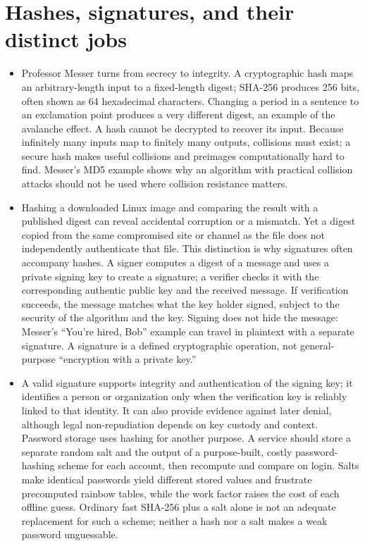 \documentclass[10pt]{article}
\begin{document}
\section*{Hashes, signatures, and their distinct jobs}

\begin{itemize}[leftmargin=1.25em, itemsep=0.3em, parsep=0pt, topsep=0pt]
    \item Professor Messer turns from secrecy to integrity. A cryptographic hash maps an arbitrary-length input to a fixed-length digest; SHA-256 produces 256 bits, often shown as 64 hexadecimal characters. Changing a period in a sentence to an exclamation point produces a very different digest, an example of the avalanche effect. A hash cannot be decrypted to recover its input. Because infinitely many inputs map to finitely many outputs, collisions must exist; a secure hash makes useful collisions and preimages computationally hard to find. Messer's MD5 example shows why an algorithm with practical collision attacks should not be used where collision resistance matters.

    \item Hashing a downloaded Linux image and comparing the result with a published digest can reveal accidental corruption or a mismatch. Yet a digest copied from the same compromised site or channel as the file does not independently authenticate that file. This distinction is why signatures often accompany hashes. A signer computes a digest of a message and uses a private signing key to create a signature; a verifier checks it with the corresponding authentic public key and the received message. If verification succeeds, the message matches what the key holder signed, subject to the security of the algorithm and the key. Signing does not hide the message: Messer's ``You're hired, Bob'' example can travel in plaintext with a separate signature. A signature is a defined cryptographic operation, not general-purpose ``encryption with a private key.''

    \item A valid signature supports integrity and authentication of the signing key; it identifies a person or organization only when the verification key is reliably linked to that identity. It can also provide evidence against later denial, although legal non-repudiation depends on key custody and context. Password storage uses hashing for another purpose. A service should store a separate random salt and the output of a purpose-built, costly password-hashing scheme for each account, then recompute and compare on login. Salts make identical passwords yield different stored values and frustrate precomputed rainbow tables, while the work factor raises the cost of each offline guess. Ordinary fast SHA-256 plus a salt alone is not an adequate replacement for such a scheme; neither a hash nor a salt makes a weak password unguessable.
\end{itemize}
\end{document}
